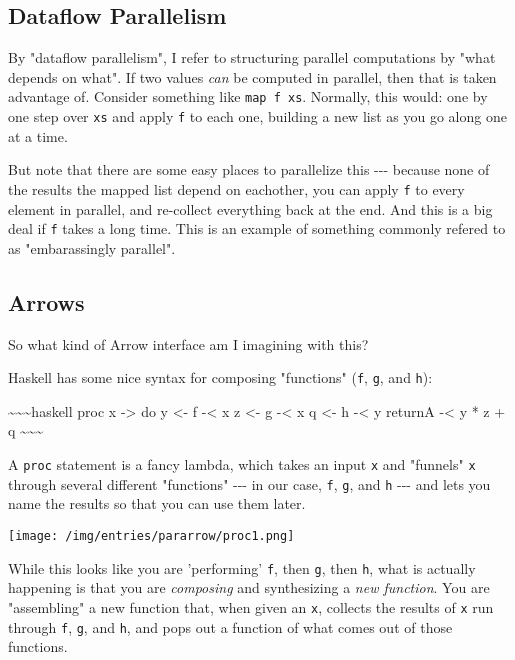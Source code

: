\documentclass[]{article}
\begin{document}
\subsection{Dataflow Parallelism}

By "dataflow parallelism", I refer to structuring parallel computations by "what
depends on what". If two values \emph{can} be computed in parallel, then that is
taken advantage of. Consider something like \texttt{map\ f\ xs}. Normally, this
would: one by one step over \texttt{xs} and apply \texttt{f} to each one,
building a new list as you go along one at a time.

But note that there are some easy places to parallelize this -\/-\/- because
none of the results the mapped list depend on eachother, you can apply
\texttt{f} to every element in parallel, and re-collect everything back at the
end. And this is a big deal if \texttt{f} takes a long time. This is an example
of something commonly refered to as "embarassingly parallel".

\subsection{Arrows}

So what kind of Arrow interface am I imagining with this?

Haskell has some nice syntax for composing "functions" (\texttt{f}, \texttt{g},
and \texttt{h}):

\textasciitilde{}\textasciitilde{}\textasciitilde{}haskell proc x
-\textgreater{} do y \textless{}- f -\textless{} x z \textless{}- g -\textless{}
x q \textless{}- h -\textless{} y returnA -\textless{} y * z + q
\textasciitilde{}\textasciitilde{}\textasciitilde{}

A \texttt{proc} statement is a fancy lambda, which takes an input \texttt{x} and
"funnels" \texttt{x} through several different "functions" -\/-\/- in our case,
\texttt{f}, \texttt{g}, and \texttt{h} -\/-\/- and lets you name the results so
that you can use them later.

\texttt{[image: /img/entries/pararrow/proc1.png]}

While this looks like you are 'performing' \texttt{f}, then \texttt{g}, then
\texttt{h}, what is actually happening is that you are \emph{composing} and
synthesizing a \emph{new function}. You are "assembling" a new function that,
when given an \texttt{x}, collects the results of \texttt{x} run through
\texttt{f}, \texttt{g}, and \texttt{h}, and pops out a function of what comes
out of those functions.
\end{document}
